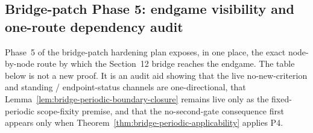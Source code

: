\subsection*{Bridge-patch Phase 5: endgame visibility and one-route dependency audit}\label{sec:bridge-patch-phase5-visibility-audit}
Phase~5 of the bridge-patch hardening plan exposes, in one place, the exact node-by-node route by which the Section~12 bridge reaches the endgame. The table below is not a new proof. It is an audit aid showing that the live no-new-criterion and standing / endpoint-status channels are one-directional, that Lemma~\ref{lem:bridge-periodic-boundary-closure} remains live only as the fixed-periodic scope-fixity premise, and that the no-second-gate consequence first appears only when Theorem~\ref{thm:bridge-periodic-applicability} applies P4.

